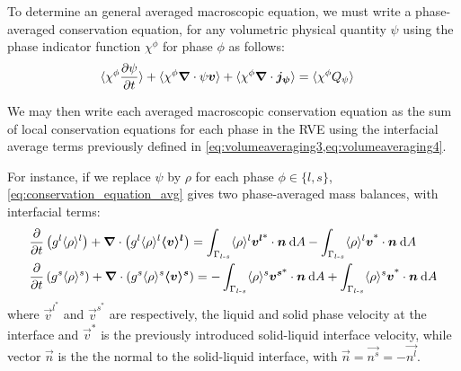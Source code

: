 To determine an general averaged macroscopic equation, we must write
a phase-averaged conservation equation, for any volumetric physical quantity $\psi$ using the phase indicator function
$\chi^\phi$ for phase $\phi$ as follows: 
\begin{align}
\label{eq:conservation_equation_avg}
& \langle \chi^\phi \frac{\partial \psi}{\partial t}  \rangle + \langle \chi^\phi \boldsymbol{\nabla} \cdot \psi \boldsymbol{v} \rangle + \langle \chi^\phi \boldsymbol{\nabla} \cdot \boldsymbol{j_{\psi}} \rangle = \langle \chi^\phi Q_{\psi} \rangle
\end{align}

We may then write each averaged macroscopic conservation
equation as the sum of local conservation equations for each phase in the RVE using the 
interfacial average terms previously defined in \cref{eq:volumeaveraging3,eq:volumeaveraging4}.

For instance, if we replace $\psi$ by $\rho$ for each phase $\phi \in \{l,s\}$, \cref{eq:conservation_equation_avg} 
gives two phase-averaged mass balances, with interfacial terms:
\begin{subequations}
\begin{align}
\label{eq:mass_liquid}
& \frac{\partial}{\partial t} \left( {g^l} \langle \rho \rangle^l \right)  + \boldsymbol{\nabla} \cdot \left( {g^l} \langle \rho \rangle^l \boldsymbol{\langle v \rangle^l} \right) =
  \int_{\Gamma_{l\text{-}s}} \langle \rho \rangle^l \boldsymbol{v^{l \text{*}}} \cdot \boldsymbol{n}\: \mathrm{d}A - \int_{\Gamma_{l\text{-}s}} \langle \rho \rangle^l \boldsymbol{v^\text{*}} \cdot \boldsymbol{n}\: \mathrm{d}A \\
\label{eq:mass_solid}
& \frac{\partial}{\partial t} \left( {g^s} \langle \rho \rangle^s \right)  + \boldsymbol{\nabla} \cdot \left( {g^s} \langle \rho \rangle^s \boldsymbol{\langle v \rangle^s} \right) = -\int_{\Gamma_{l\text{-}s}} \langle \rho \rangle^s \boldsymbol{v^{s \text{*}}} \cdot \boldsymbol{n}\: \mathrm{d}A + \int_{\Gamma_{l\text{-}s}} \langle \rho \rangle^s \boldsymbol{v^\text{*}} \cdot \boldsymbol{n}\: \mathrm{d}A
\end{align}
\end{subequations}
where $\vec{v}^{l^*}$ and $\vec{v}^{s^*}$ are respectively, the liquid 
and solid phase velocity at the interface and $\vec{v}^*$ is the previously introduced solid-liquid interface velocity, while vector $\vec{n}$ is the the normal to the solid-liquid interface, with $\vec{n}=\vec{n^s}=-\vec{n^l}$.

